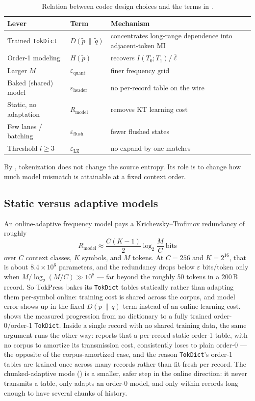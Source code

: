 \documentclass[10pt,twocolumn]{article}
\theoremstyle{plain}
\theoremstyle{definition}
\newcommand{\KL}[2]{D\!\left(#1 \,\|\, #2\right)}
\begin{document}
\begin{table}[t]
\centering\small
\caption{Relation between codec design choices and the terms in
.}
\label{tab:ledger}
\begin{tabular}{@{}p{3.0cm}p{1.5cm}p{2.7cm}@{}}
\toprule
\textbf{Lever} & \textbf{Term} & \textbf{Mechanism} \\
\midrule
Trained \texttt{TokDict} & $\KL{\tilde p}{\tilde q}$ & concentrates long-range
dependence into adjacent-token MI \\
Order-1 modeling & $H(\tilde p)$ & recovers $I(T_0;T_1)/\bar\ell$ \\
Larger $M$ & $\varepsilon_{\mathrm{quant}}$ & finer frequency grid \\
Baked (shared) model & $\varepsilon_{\mathrm{header}}$ & no per-record table on
the wire \\
Static, no adaptation & $R_{\mathrm{model}}$ & removes KT learning cost \\
Few lanes / batching & $\varepsilon_{\mathrm{flush}}$ & fewer flushed states \\
Threshold $l \ge 3$ & $\varepsilon_{\mathrm{LZ}}$ & no expand-by-one matches \\
\bottomrule
\end{tabular}
\end{table}

By , tokenization does not change the source entropy. Its role is to
change how much model mismatch is attainable at a fixed context order.

\subsection{Static versus adaptive models}\label{sec:bake}

An online-adaptive frequency model pays a Krichevsky--Trofimov redundancy
\cite{kt1981} of roughly
\[
R_{\mathrm{model}} \approx \frac{C(K-1)}{2}\log_2 \frac{M}{C}\ \text{bits}
\]
over $C$ context classes, $K$ symbols, and $M$ tokens. At $C=256$ and $K=2^{16}$,
that is about $8.4\times10^6$ parameters, and the redundancy drops below
$\varepsilon$ bits/token only when $M/\log_2(M/C)\gg10^8$ --- far beyond the roughly
50 tokens in a 200\,B record. So TokPress bakes its \texttt{TokDict} tables statically
rather than adapting them per-symbol online: training cost is shared across the
corpus, and model error shows up in the fixed $\KL{p}{q}$ term instead of an online
learning cost.  shows the measured progression from no
dictionary to a fully trained order-0/order-1 \texttt{TokDict}. Inside a single
record with no shared training data, the same argument runs the other way:
 reports that a per-record static order-1 table, with no corpus to
amortize its transmission cost, consistently loses to plain order-0 --- the opposite
of the corpus-amortized case, and the reason \texttt{TokDict}'s order-1 tables are
trained once across many records rather than fit fresh per record. The chunked-adaptive
mode () is a smaller, safer step in the online direction: it never
transmits a table, only adapts an order-0 model, and only within records long enough
to have several chunks of history.
\end{document}

